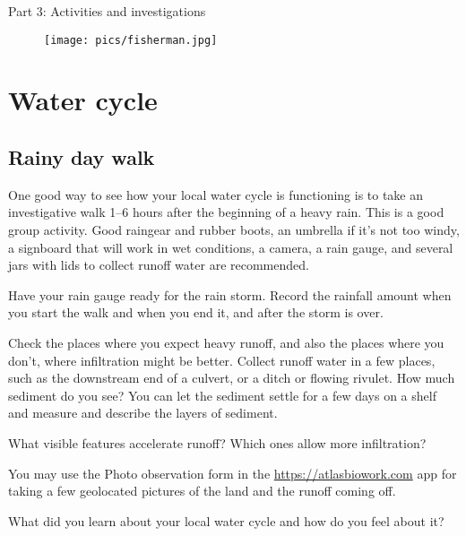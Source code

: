 \documentclass[11pt,letterpaper,twoside,onecolumn]{memoir}
\begin{document}
\clearpage


\Huge{Part 3: Activities and investigations}
\normalsize
\thispagestyle{empty}


\vspace*{3 em}
\begin{figure}[h]
\centering
\texttt{[image: pics/fisherman.jpg]}
\end{figure}
\clearpage

\chapter{Water cycle}

\section*{Rainy day walk}

One good way to see how your local water cycle is functioning is to take an investigative walk 1--6 hours after the beginning of a heavy rain. This is a good group activity. Good raingear and rubber boots, an umbrella if it's not too windy, a signboard that will work in wet conditions, a camera, a rain gauge, and several jars with lids to collect runoff water are recommended.

Have your rain gauge ready for the rain storm. Record the rainfall amount when you start the walk and when you end it, and after the storm is over.

Check the places where you expect heavy runoff, and also the places where you don't, where infiltration might be better. Collect runoff water in a few places, such as the downstream end of a culvert, or a ditch or flowing rivulet. How much sediment do you see? You can let the sediment settle for a few days on a shelf and measure and describe the layers of sediment.

What visible features accelerate runoff? Which ones allow more infiltration?

You may use the Photo observation form in the \url{https://atlasbiowork.com} app for taking a few geolocated pictures of the land and the runoff coming off.

What did you learn about your local water cycle and how do you feel about it?
\end{document}
